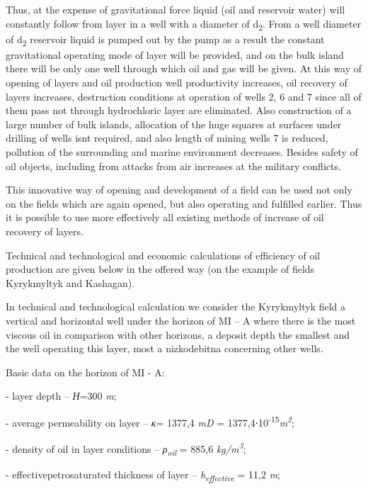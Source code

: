 \begin{multicols}{2}
Thus, at the expense of gravitational force liquid (oil and reservoir
water) will constantly follow from layer in a well with a diameter of
d\textsubscript{2}. From a well diameter of d\textsubscript{2} reservoir
liquid is pumped out by the pump as a result the constant gravitational
operating mode of layer will be provided, and on the bulk island there
will be only one well through which oil and gas will be given. At this
way of opening of layers and oil production well productivity increases,
oil recovery of layers increases, destruction conditions at operation of
wells 2, 6 and 7 since all of them pass not through hydrochloric layer
are eliminated. Also construction of a large number of bulk islands,
allocation of the huge squares at surfaces under drilling of wells
isn\textquotesingle t required, and also length of mining wells 7 is
reduced, pollution of the surrounding and marine environment decreases.
Besides safety of oil objects, including from attacks from air increases
at the military conflicts.

This innovative way of opening and development of a field can be used
not only on the fields which are again opened, but also operating and
fulfilled earlier. Thus it is possible to use more effectively all
existing methods of increase of oil recovery of layers.

Technical and technological and economic calculations of efficiency of
oil production are given below in the offered way (on the example of
fields Kyrykmyltyk and Kashagan).

In technical and technological calculation we consider the Kyrykmyltyk
field a vertical and horizontal well under the horizon of MI -- A where
there is the most viscous oil in comparison with other horizons, a
deposit depth the smallest and the well operating this layer, most a
nizkodebitna concerning other wells.

Basic data on the horizon of MI - A:

- layer depth -- \emph{Н}=300 \emph{m};

- average permeability on layer -- \emph{к}= 1377,4 \emph{mD} =
1377,4⋅10\textsuperscript{-15}\emph{m\textsuperscript{2}};

- density of oil in layer conditions -- \emph{ρ\textsubscript{oil}} =
885,6 \emph{kg/m\textsuperscript{3}};

- effectivepetrosaturated thickness of layer --
\emph{h\textsubscript{effective}} = 11,2 \emph{m};


\end{multicols}
